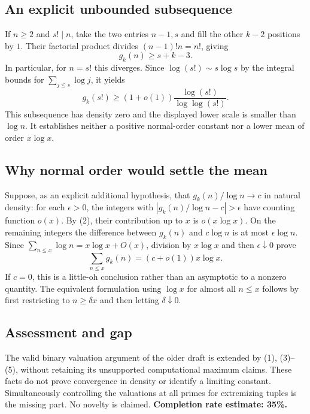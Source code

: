 \subsection*{An explicit unbounded subsequence}
If $n\ge2$ and $s!\mid n$, take the two entries $n-1,s$ and fill the other $k-2$ positions by $1$. Their factorial product divides $(n-1)!n=n!$, giving
\[
 g_k(n)\ge s+k-3. \tag{4}
\]
In particular, for $n=s!$ this diverges. Since $\log(s!)\sim s\log s$ by the integral bounds for $\sum_{j\le s}\log j$, it yields
\[
 g_k(s!)\ge(1+o(1))\frac{\log(s!)}{\log\log(s!)}.
\]
This subsequence has density zero and the displayed lower scale is smaller than $\log n$. It establishes neither a positive normal-order constant nor a lower mean of order $x\log x$.

\subsection*{Why normal order would settle the mean}
Suppose, as an explicit additional hypothesis, that $g_k(n)/\log n\to c$ in natural density: for each $\epsilon>0$, the integers with $|g_k(n)/\log n-c|>\epsilon$ have counting function $o(x)$. By (2), their contribution up to $x$ is $o(x\log x)$. On the remaining integers the difference between $g_k(n)$ and $c\log n$ is at most $\epsilon\log n$. Since $\sum_{n\le x}\log n=x\log x+O(x)$, division by $x\log x$ and then $\epsilon\downarrow0$ prove
\[
 \sum_{n\le x}g_k(n)=(c+o(1))x\log x. \tag{5}
\]
If $c=0$, this is a little-oh conclusion rather than an asymptotic to a nonzero quantity. The equivalent formulation using $\log x$ for almost all $n\le x$ follows by first restricting to $n\ge\delta x$ and then letting $\delta\downarrow0$.

\subsection*{Assessment and gap}
The valid binary valuation argument of the older draft is extended by (1), (3)--(5), without retaining its unsupported computational maximum claims. These facts do not prove convergence in density or identify a limiting constant. Simultaneously controlling the valuations at all primes for extremizing tuples is the missing part. No novelty is claimed.
\textbf{Completion rate estimate: 35\%.}
